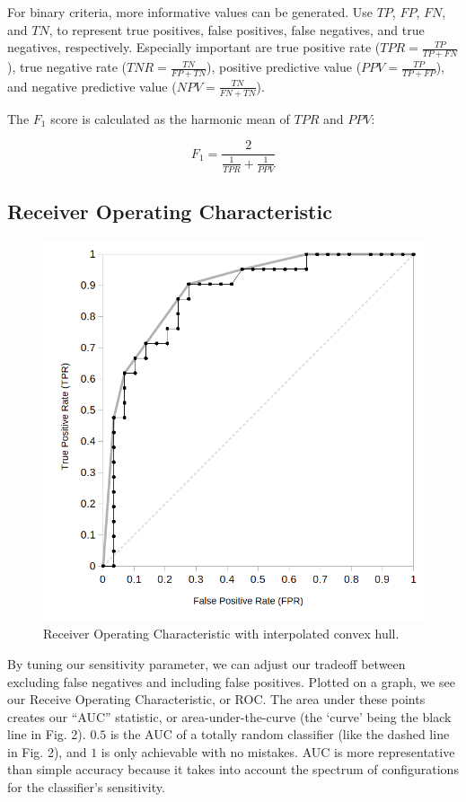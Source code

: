 \documentclass[format=acmlarge]{acmart}
\begin{document}
For binary criteria, more informative values can be generated.  Use $\mathit{TP}$, $\mathit{FP}$, $\mathit{FN}$, and $\mathit{TN}$, to represent true positives, false positives, false negatives, and true negatives, respectively.  Especially important are true positive rate ($\mathit{TPR} = \frac{\mathit{TP}}{\mathit{TP} + \mathit{FN}}$), true negative rate ($\mathit{TNR} = \frac{\mathit{TN}}{\mathit{FP} + \mathit{TN}}$), positive predictive value ($\mathit{PPV} = \frac{\mathit{TP}}{\mathit{TP} + \mathit{FP}}$), and negative predictive value ($\mathit{NPV} = \frac{\mathit{TN}}{\mathit{FN} + \mathit{TN}}$).

The $F_1$ score is calculated as the harmonic mean of $\mathit{TPR}$ and $\mathit{PPV}$:

$$F_1 = \frac{2}{\frac{1}{\mathit{TPR}} + \frac{1}{\mathit{PPV}}}$$

\subsection{Receiver Operating Characteristic}
\begin{figure}
  \includegraphics{interpolated-roc}
  \caption{Receiver Operating Characteristic with interpolated convex hull.}
  \label{fig:two}
\end{figure}

By tuning our sensitivity parameter, we can adjust our tradeoff between excluding false negatives and including false positives.  Plotted on a graph, we see our Receive Operating Characteristic, or ROC.  The area under these points creates our ``AUC'' statistic, or area-under-the-curve (the `curve' being the black line in Fig. 2).  $0.5$ is the AUC of a totally random classifier (like the dashed line in Fig. 2), and $1$ is only achievable with no mistakes.  AUC is more representative than simple accuracy because it takes into account the spectrum of configurations for the classifier's sensitivity.
\end{document}
